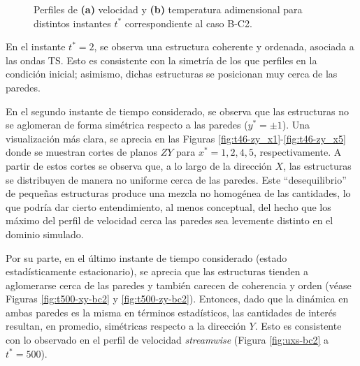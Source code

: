 \newpage

\begin{figure}[H]
  \centering  
  
  \caption{Perfiles de \textbf{(a)} velocidad y \textbf{(b)} temperatura adimensional para distintos instantes $t^*$ correspondiente al caso B-C2.}
    \label{fig:mosaico-bc2}
\end{figure}

En el instante $t^* = 2$, se observa una estructura coherente y ordenada, asociada a las ondas TS. Esto es consistente con la simetría de los que perfiles en la condición inicial; asimismo, dichas estructuras se posicionan muy cerca de las paredes.

En el segundo instante de tiempo considerado, se observa que las estructuras no se \linebreak aglomeran de forma simétrica respecto a las paredes ($y^*=\pm 1$). Una visualización más clara, se aprecia en las Figuras \ref{fig:t46-zy_x1}-\ref{fig:t46-zy_x5} donde se muestran cortes de planos $ZY$ para $x^*=1,2,4,5$, respectivamente. A partir de estos cortes se observa que, a lo largo de la dirección $X$, las estructuras se distribuyen de manera no uniforme cerca de las paredes. Este ``desequilibrio'' de pequeñas estructuras produce una mezcla no homogénea de las cantidades, lo que podría dar cierto entendimiento, al menos conceptual, del hecho que los máximo del perfil de velocidad cerca las paredes sea levemente distinto en el dominio simulado.   

Por su parte, en el último instante de tiempo considerado (estado estadísticamente estacionario), se aprecia que las estructuras  tienden a aglomerarse cerca de las paredes y también carecen de coherencia y orden (véase Figuras \ref{fig:t500-xy-bc2} y \ref{fig:t500-zy-bc2}). Entonces, dado que la dinámica en ambas paredes es la misma en términos estadísticos, las cantidades de interés resultan, en promedio, simétricas respecto a la dirección $Y$. Esto es consistente con lo observado en el perfil de velocidad \textit{streamwise} (Figura \ref{fig:uxs-bc2} a $t^*=500$).

